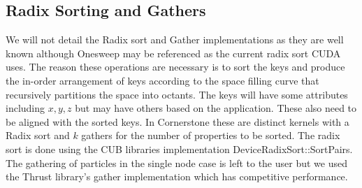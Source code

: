 \subsection{Radix Sorting and Gathers}
We will not detail the Radix sort and Gather implementations as they are well known although Onesweep \cite{adinets2022onesweepfastersignificantdigit} may be referenced as the current radix sort CUDA uses. The reason these operations are necessary is to sort the keys and produce the in-order arrangement of keys according to the space filling curve that recursively partitions the space into octants. The keys will have some attributes including $x,y,z$ but may have others based on the application. These also need to be aligned with the sorted keys. In Cornerstone these are distinct kernels with a Radix sort and $k$ gathers for the number of properties to be sorted. The radix sort is done using the CUB libraries implementation DeviceRadixSort::SortPairs. The gathering of particles in the single node case is left to the user but we used the Thrust library's gather implementation which has competitive performance.

